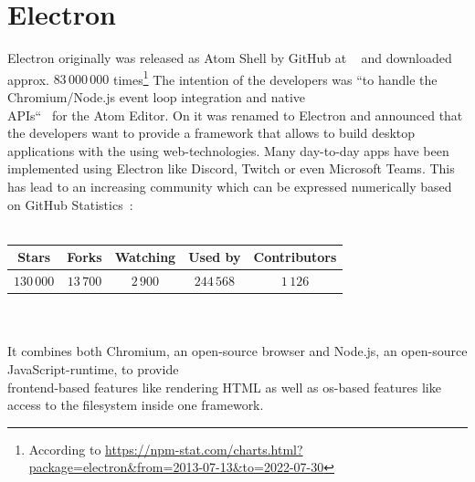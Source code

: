 \section{Electron}
\label{sec:electron}
Electron originally was released as Atom Shell by GitHub at ~\cite{githubReleaseV010} and downloaded approx. $83\,000\,000$ times\footnote{According to \url{https://npm-stat.com/charts.html?package=electron&from=2013-07-13&to=2022-07-30}}
The intention of the developers was ``to handle the Chromium/Node.js event loop integration and native\\APIs``~\cite{sawicki_2015} for the Atom Editor.
On  it was renamed to Electron and announced that the developers want to provide a framework that allows to build desktop applications with the using web-technologies.
Many day-to-day apps have been implemented using Electron like Discord, Twitch or even Microsoft Teams.
This has lead to an increasing community which can be expressed numerically based on GitHub Statistics~\cite{GithubElectron}: \\ \\
\begin{tabular} {| c | c | c | c | c |}
    \label{tab:electron:statistics}
    Stars      & Forks     & Watching & Used by    & Contributors \\ \hline
    $130\,000$ & $13\,700$ & $2\,900$ & $244\,568$ & $1\,126$
\end{tabular} \\ \\
It combines both Chromium, an open-source browser and Node.js, an open-source JavaScript-runtime, to provide \\frontend-based features like rendering \ac{HTML} as well as os-based features like access to the filesystem inside one framework.
